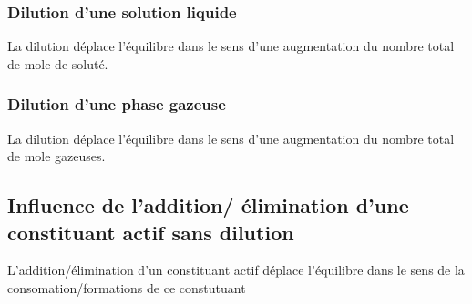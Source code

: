 \documentclass[french]{yLectureNote}
\begin{document}
\subsubsection{Dilution d'une solution liquide}
La dilution déplace l'équilibre dans le sens d'une augmentation du nombre total de mole de soluté.
\subsubsection{Dilution d'une phase gazeuse}
La dilution déplace l'équilibre dans le sens d'une augmentation du nombre total de mole gazeuses.
\subsection{Influence de l'addition/ élimination d'une constituant actif sans dilution}
L'addition/élimination d'un constituant actif déplace l'équilibre dans le sens de la consomation/formations de ce constutuant
\end{document}
